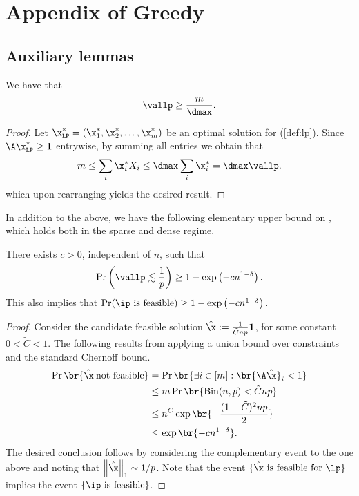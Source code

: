 \chapter{Appendix of Greedy}
\section{Auxiliary lemmas}\label{appendix:aux_lemmas}
%
\begin{lemma}
\label{lemma:lp_lb} We have that
\[\vallp \geq \frac{m}{\dmax}.\]
\end{lemma}
\begin{proof}
Let $\x^*_{\texttt{LP}} = (\x_1^*, \x_2^*, \ldots, \x_m^*)$ be an optimal solution for (\ref{def:lp}). Since $\A \x^*_{\texttt{LP}} \geq \mathbf{1}$ entrywise, by summing all entries we obtain that  
\[
m \leq \sum_{i} \x^*_i X_i \leq \dmax\sum_i \x^*_i = \dmax \vallp.
\]
which upon rearranging yields the desired result.
\end{proof}
\noindent
In addition to the above, we have the following elementary upper bound on \vallp, which holds both in the sparse and dense regime. 
\begin{lemma}
\label{lemma:lp_ub}
    There exists $c > 0$, independent of $n$, such that
    \begin{equation*}
    \Pr\left(\vallp \lesssim \frac{1}{p}\right) \geq 1 - \exp\left(-cn^{1-\delta}\right).
\end{equation*}
This also implies that \(\Pr(\ip \text{ is feasible}) \geq 1 - \exp\left(-cn^{1-\delta}\right).\)
\end{lemma}
\begin{proof}
    Consider the candidate feasible solution \(\hat{\x} := \frac{1}{\tilde{C} np} \mathbf{1}\), for some constant $0<\tilde{C}<1$. The following results from applying a union bound over constraints and the standard Chernoff bound.
    \begin{align*}
        \Pr\br{\hat{\x} \: \text{not feasible}} & = \Pr\br{\exists i \in [m]: \br{\A \hat{\x}}_i < 1} \\
        & \leq m \Pr\br{\text{Bin}(n,p)< \tilde{C}np} \\
        & \leq n^C \exp\br{-\frac{(1-\tilde{C})^2np}{2}}\\
        & \leq \exp\br{-c n^{1-\delta}}.
    \end{align*}
The desired conclusion follows by considering the complementary event to the one above and noting that $\left \|\hat{\x}\right\|_1 \sim 1/p$. Note that the event \(\{\hat{\x} \text{ is feasible for } \lp\}\) implies the event \(\{\ip \text{ is feasible}\}\).
\end{proof}
